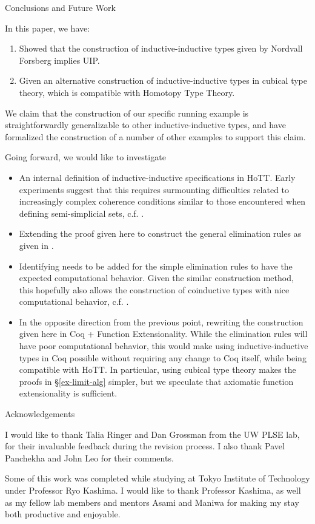 \documentclass[runningheads]{llncs}
\def\Forsberg/{Nordvall Forsberg}
\begin{document}
\begin{section}{Conclusions and Future Work}

In this paper, we have:
\begin{enumerate}
    \item Showed that the construction of inductive-inductive types given by \Forsberg/ implies UIP.
    \item Given an alternative construction of inductive-inductive types in cubical type theory, which is compatible with Homotopy Type Theory.
\end{enumerate}

We claim that the construction of our specific running example is straightforwardly generalizable to other inductive-inductive types, and have formalized the construction of a number of other examples to support this claim.

Going forward, we would like to investigate
\begin{itemize}
    \item An internal definition of inductive-inductive specifications in HoTT. Early experiments suggest that this requires surmounting difficulties related to increasingly complex coherence conditions similar to those encountered when defining semi-simplicial sets, c.f. \citet{simplicialsets}.
    \item Extending the proof given here to construct the general elimination rules as given in \cite{KaposiKovacsHIITsyntax}.
    \item Identifying needs to be added for the simple elimination rules to have the expected computational behavior. Given the similar construction method, this hopefully also allows the construction of coinductive types with nice computational behavior, c.f. \citet{nonwellfoundedtrees}.
    \item In the opposite direction from the previous point, rewriting the construction given here in Coq + Function Extensionality. While the elimination rules will have poor computational behavior, this would make using inductive-inductive types in Coq possible without requiring any change to Coq itself, while being compatible with HoTT. In particular, using cubical type theory makes the proofs in \S\ref{ex-limit-alg} simpler, but we speculate that axiomatic function extensionality is sufficient.
\end{itemize}

\end{section}

\begin{section}{Acknowledgements}

I would like to thank Talia Ringer and Dan Grossman from the UW PLSE lab, for their invaluable feedback during the revision process. I also thank Pavel Panchekha and John Leo for their comments.

Some of this work was completed while studying at Tokyo Institute of Technology under Professor Ryo Kashima. I would like to thank Professor Kashima, as well as my fellow lab members and mentors Asami and Maniwa for making my stay both productive and enjoyable.

\end{section}



\end{document}
